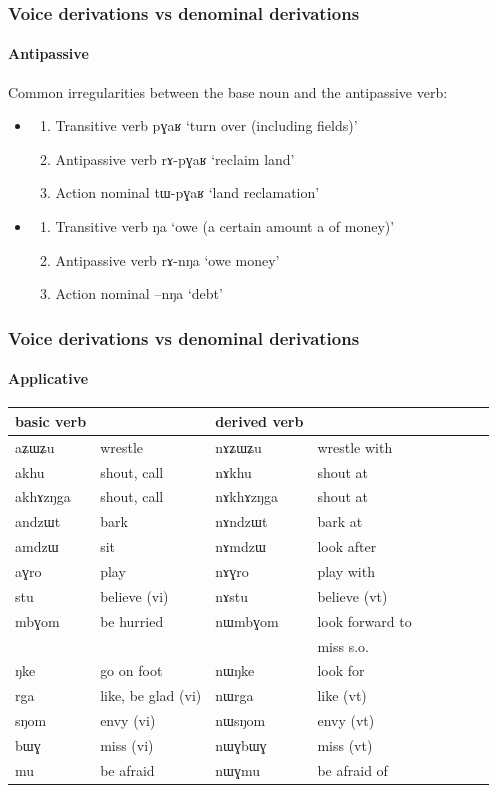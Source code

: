 \documentclass[xcolor=table]{beamer}
\newcommand{\ipa}[1]{{\phon \mbox{#1}}} %
\begin{document}
  \begin{frame} 
\frametitle{Voice derivations vs denominal derivations} 
\framesubtitle{Antipassive} 
 
Common irregularities between the base noun and the antipassive verb:
\begin{itemize}
\item
  \begin{enumerate}
\item Transitive verb \ipa{pɣaʁ} `turn over (including fields)' 
 \item Antipassive verb \ipa{rɤ-pɣaʁ} `reclaim land' 
  \item Action nominal \ipa{tɯ-pɣaʁ} `land reclamation' 
\end{enumerate}
 \item
   \begin{enumerate}
\item Transitive verb \ipa{ŋa} `owe (a certain amount a of money)' 
 \item Antipassive verb \ipa{rɤ-nŋa} `owe money' 
  \item Action nominal \ipa{--nŋa} `debt' 
\end{enumerate}
\end{itemize}

\end{frame}    
 
 \begin{frame} 
\frametitle{Voice derivations vs denominal derivations} 
\framesubtitle{Applicative} 
 
 \begin{tabular}{lllllllll} \toprule
basic verb  & &derived  verb &\\
\midrule
 \ipa{aʑɯʑu}  & wrestle	& \ipa{nɤʑɯʑu}  & wrestle with\\
\ipa{akhu}  &	shout, call&\ipa{nɤkhu}  & shout at \\
\ipa{akhɤzŋga}&	shout, call&\ipa{nɤkhɤzŋga}  & shout at \\
\ipa{andzɯt}  &	bark&\ipa{nɤndzɯt}  & bark at \\
\ipa{amdzɯ}  &sit & \ipa{nɤmdzɯ}  &look after\\
\ipa{aɣro}&play&\ipa{nɤɣro} & play with \\
    \ipa{stu}  &believe (vi)	& \ipa{nɤstu}  & believe (vt)\\
\midrule
\ipa{mbɣom}  &	be hurried & \ipa{nɯmbɣom}  & look  forward to\\
&&& miss s.o.\\
\ipa{ŋke}  &go on foot	& \ipa{nɯŋke}  & look for \\
\ipa{rga}  &	like, be glad (vi) & \ipa{nɯrga}  &like (vt) \\
\ipa{sŋom}  &	envy (vi) & \ipa{nɯsŋom}  &envy (vt) \\
\midrule
  \ipa{bɯɣ}  &miss (vi)	& \ipa{nɯɣbɯɣ}  & miss (vt)\\
  \ipa{mu} & be afraid & \ipa{nɯɣmu} & be afraid of \\
\bottomrule
\end{tabular}
\end{frame}    
\end{document}
